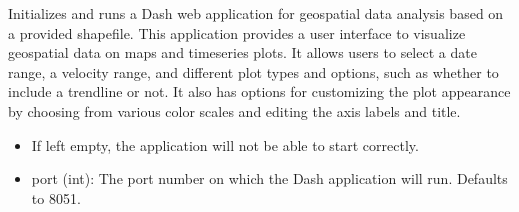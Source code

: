 \documentclass[letterpaper,10pt,english]{sphinxmanual}
\begin{document}
\begin{fulllineitems}
\label{\detokenize{akhdefo_functions:akhdefo_functions.Akhdefo_TS.akhdefo_dashApp}}
\pysigstartsignatures
{}
\pysigstopsignatures
\sphinxAtStartPar
Initializes and runs a Dash web application for geospatial data analysis based on a provided shapefile.
This application provides a user interface to visualize geospatial data on maps and time\sphinxhyphen{}series plots.
It allows users to select a date range, a velocity range, and different plot types and options, such as
whether to include a trendline or not. It also has options for customizing the plot appearance by choosing 
from various color scales and editing the axis labels and title.
\begin{description}
\begin{itemize}
\item {} \begin{description}
\sphinxAtStartPar
If left empty, the application will not be able to start correctly.

\end{description}

\item {} 
\sphinxAtStartPar
port (int): The port number on which the Dash application will run. Defaults to 8051.

\end{itemize}


\end{description}
\end{fulllineitems}
\end{document}
